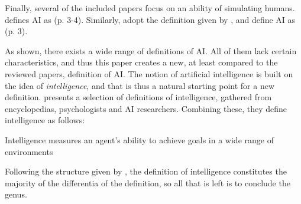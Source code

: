 Finally, several of the included papers focus on an ability of simulating humans. \textcite{Liu_2021} defines AI as  (p. 3-4). Similarly, \textcite{vanBruxvoort_2021} adopt the definition given by \textcite{Shubhendu_2013}, and define AI as  (p. 3).

As shown, there exists a wide range of definitions of AI. All of them lack certain characteristics, and thus this paper creates a new, at least compared to the reviewed papers, definition of AI. The notion of artificial intelligence is built on the idea of \textit{intelligence}, and that is thus a natural starting point for a new definition. \textcite{Legg_2007} presents a selection of definitions of intelligence, gathered from encyclopedias, psychologists and AI researchers. Combining these, they define intelligence as follows:
\begin{displayquote}
    Intelligence measures an agent’s ability to achieve goals in a wide range of environments
\end{displayquote}
Following the structure given by \textcite{Seppälä_2014}, the definition of intelligence constitutes the majority of the differentia of the definition, so all that is left is to conclude the genus.

